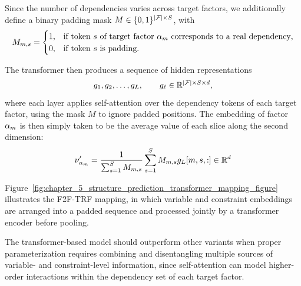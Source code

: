 Since the number of dependencies varies across target factors, we additionally define a binary padding mask $M \in \{0,1\}^{|\mathcal{F}| \times S}$, with
\begin{equation*}
M_{m,s} =
\begin{cases}
1, & \text{if token } s \text{ of target factor } \alpha_m \text{ corresponds to a real dependency},\\
0, & \text{if token } s \text{ is padding}.
\end{cases}
\end{equation*}

The transformer then produces a sequence of hidden representations
\begin{equation*}
g_1, g_2, \dots, g_L,
\qquad
g_\ell \in \mathbb R^{|\mathcal{F}| \times S \times d},
\end{equation*}
where each layer applies self-attention over the dependency tokens of each target factor, using the mask $M$ to ignore padded positions. The embedding of factor $\alpha_m$ is then simply taken to be the average value of each slice along the second dimension: 
\begin{equation}
    \nu'_{\alpha_m} = \frac{1}{\sum^S_{s=1} M_{m,s}} \sum\limits_{s=1}^S M_{m,s} g_{L}[m,s,:] \in \mathbb{R}^d
\end{equation}

Figure~\ref{fig:chapter_5_structure_prediction_transformer_mapping_figure} illustrates the F2F-TRF mapping, in which variable and constraint embeddings are arranged into a padded sequence and processed jointly by a transformer encoder before pooling.

The transformer-based model should outperform other variants when proper parameterization requires combining and disentangling multiple sources of variable- and constraint-level information, since self-attention can model higher-order interactions within the dependency set of each target factor.



